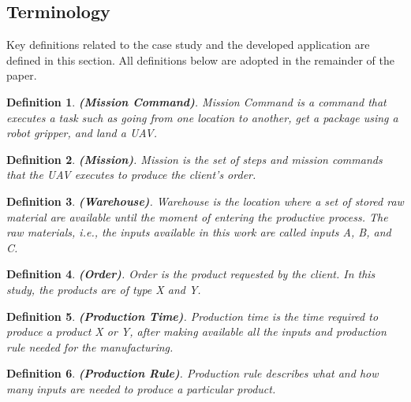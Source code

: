 \documentclass[12pt]{article}
\newtheorem{myDefinition}{Definition}
\begin{document}
\subsection{Terminology}
\label{sec:terms}

Key definitions related to the case study and the developed application are defined in this section. All definitions below are adopted in the remainder of the paper.

\begin{myDefinition} 
\textbf{(Mission Command)}. 
Mission Command is a command that executes a task such as going from one location to another, get a package using a robot gripper, and land a UAV.
\label{def:missioncommand}
\end{myDefinition}

\begin{myDefinition}
\textbf{(Mission)}.
Mission is the set of steps and mission commands that the UAV executes to produce the client's order.
\label{def:mission}
\end{myDefinition}

\begin{myDefinition}
\textbf{(Warehouse)}.
Warehouse is the location where a set of stored raw material are available until the moment of entering the productive process. The raw materials, \textit{i.e.}, the inputs available in this work are called inputs A, B, and C.
\label{def:almoxarifado}
\end{myDefinition}

\begin{myDefinition} 
\textbf{(Order)}.
Order is the product requested by the client. In this study, the products are of type X and Y.
\label{def:pedido}
\end{myDefinition}

\begin{myDefinition}
\textbf{(Production Time)}.
Production time is the time required to produce a product X or Y, after making available all the inputs and production rule needed for the manufacturing.
\label{def:tempoProducao}
\end{myDefinition}

\begin{myDefinition}
 \textbf{(Production Rule)}.
Production rule describes what and how many inputs are needed to produce a particular product.
\label{def:regraProducao}
\end{myDefinition}
\end{document}
